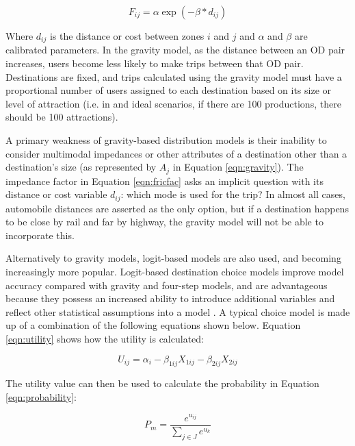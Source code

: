 \begin{equation}
	F_{ij} = \alpha \exp(-\beta * d_{ij})
  \label{eqn:fricfac}
\end{equation}

\noindent Where $d_{ij}$ is the distance or cost between zones $i$ and $j$ and $\alpha$
and $\beta$ are calibrated parameters. In the gravity model, as the distance
between an OD pair increases, users become less likely to make trips between
that OD pair. Destinations are fixed, and trips calculated using the
gravity model must have a proportional number of users assigned to each
destination based on its size or level of attraction (i.e. in and ideal
scenarios, if there are 100
productions, there should be 100 attractions).

A primary weakness of gravity-based distribution models is their inability to
consider multimodal impedances or other attributes of a destination other than
a destination's size (as represented by $A_j$ in Equation \ref{eqn:gravity}). The
impedance factor in Equation \ref{eqn:fricfac} asks an implicit question with its
distance or cost variable $d_{ij}$: which mode is used for the trip? In almost
all cases, automobile distances are asserted as the only option, but if a
destination happens to be close by rail and far by highway, the gravity model
will not be able to incorporate this.

Alternatively to gravity models, logit-based models are also used, and becoming
increasingly more popular. Logit-based destination choice models improve model
accuracy compared with gravity and four-step models, and are advantageous because
they possess an increased ability to introduce additional variables and reflect
other statistical assumptions into a model \citep{tfr2021}. A typical choice
model is made up of a combination of the following equations shown below.
Equation \ref{eqn:utility} shows how the utility is calculated:

\begin{equation}
  U_{ij} = \alpha_i - {\beta_{1ij}}{X_{1ij}} - {\beta_{2ij}}{X_{2ij}}
    \label{eqn:utility}
\end{equation}

\noindent The utility value can then be used to calculate the probability
in Equation \ref{eqn:probability}:

\begin{equation}
{P}_{m} = \frac{e^{u_{ij}}}{\sum_{j\in J}e^{u_{k}}}
  \label{eqn:probability}
\end{equation}


